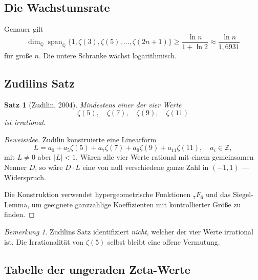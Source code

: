 \documentclass[12pt,a4paper]{amsart}
\newtheorem{theorem}{Satz}[section]
\theoremstyle{definition}
\theoremstyle{remark}
\newtheorem*{bemerkung}{Bemerkung}
\begin{document}
\subsection{Die Wachstumsrate}

Genauer gilt
\[
  \dim_{\mathbb{Q}} \operatorname{span}_{\mathbb{Q}}\{1, \zeta(3), \zeta(5),
  \ldots, \zeta(2n+1)\} \geq \frac{\ln n}{1 + \ln 2} \approx \frac{\ln n}{1{,}6931}
\]
für große $n$. Die untere Schranke wächst logarithmisch.

\subsection{Zudilins Satz}

\begin{theorem}[Zudilin, 2004]\label{thm:zudilin}
  Mindestens einer der vier Werte
  \[
    \zeta(5),\quad \zeta(7),\quad \zeta(9),\quad \zeta(11)
  \]
  ist irrational.
\end{theorem}

\begin{proof}[Beweisidee]
  Zudilin konstruierte eine Linearform
  \[
    L = a_0 + a_5 \zeta(5) + a_7 \zeta(7) + a_9 \zeta(9) + a_{11} \zeta(11),
    \quad a_i \in \mathbb{Z},
  \]
  mit $L \neq 0$ aber $|L| < 1$. Wären alle vier Werte rational mit einem
  gemeinsamen Nenner $D$, so wäre $D \cdot L$ eine von null verschiedene ganze
  Zahl in $(-1, 1)$ --- Widerspruch.

  Die Konstruktion verwendet hypergeometrische Funktionen ${}_{7}F_6$ und das
  Siegel-Lemma, um geeignete ganzzahlige Koeffizienten mit kontrollierter Größe
  zu finden.
\end{proof}

\begin{bemerkung}
  Zudilins Satz identifiziert \emph{nicht}, welcher der vier Werte irrational ist.
  Die Irrationalität von $\zeta(5)$ selbst bleibt eine offene Vermutung.
\end{bemerkung}

\subsection{Tabelle der ungeraden Zeta-Werte}
\end{document}
